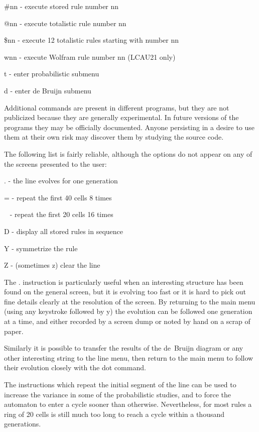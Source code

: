 \begin{list}{}{}
\begin{list}{}{}
\item[\#nn] - execute stored rule number nn 
\item[@nn] - execute totalistic rule number nn 
\item[\$nn] - execute 12 totalistic rules starting with number nn 
\item[wnn] - execute Wolfram rule number nn (LCAU21 only) 

\item[t] - enter probabilistic submenu 
\item[d] - enter de Bruijn submenu 
\end{list} 

Additional commands are present in different programs, but they are not 
publicized because they are generally experimental. In future versions 
of the programs they may be officially documented. Anyone persisting in 
a desire to use them at their own risk may discover them by studying 
the source code. 

The following list is fairly reliable, although the options do not 
appear on any of the screens presented to the user: 

\begin{list}{}{}
\item[.] - the line evolves for one generation 
\item[=] - repeat the first 40 cells 8 times 
\item[~] - repeat the first 20 cells 16 times 
\item[D] - display all stored rules in sequence 
\item[Y] - symmetrize the rule 
\item[Z] - (sometimes z) clear the line 
\end{list} 

The $.$ instruction is particularly useful when an interesting 
structure has been found on the general screen, but it is evolving too 
fast or it is hard to pick out fine details clearly at the resolution 
of the screen. By returning to the main menu (using any keystroke 
followed by y) the evolution can be followed one generation at a time, 
and either recorded by a screen dump or noted by hand on a scrap of 
paper.

Similarly it is possible to transfer the results of the de~Bruijn 
diagram or any other interesting string to the line menu, then return 
to the main menu to follow their evolution closely with the dot 
command. 

The instructions which repeat the initial segment of the line can be 
used to increase the variance in some of the probabilistic studies, and 
to force the automaton to enter a cycle sooner than otherwise. 
Nevertheless, for most rules a ring of 20 cells is still much too long to 
reach a cycle within a thousand generations. 


\end{list}
